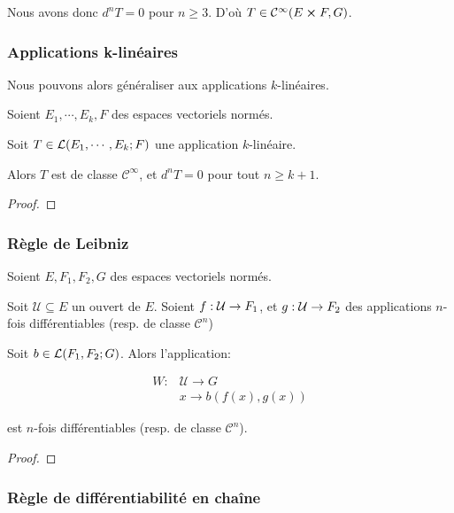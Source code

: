 Nous avons donc $d^{n}T = 0$ pour $n \geq 3$. D'où $T \in
\mathcal{C}^{\infty}(E \cross F, G)$.

\subsubsection{Applications k-linéaires}

Nous pouvons alors généraliser aux applications $k$-linéaires.

\begin{proposition}
	Soient $E_{1}, \cdots, E_{k}, F$ des espaces vectoriels normés.

	Soit $T \in \mathcal{L}(E_{1}, \cdots, E_{k}; F)$ une application
	$k$-linéaire.

	Alors $T$ est de classe $\mathcal{C}^{\infty}$, et $d^{n}T = 0$ pour tout $n
	\geq k + 1$.
\end{proposition}

\begin{proof}

\end{proof}

\subsubsection{Règle de Leibniz}

\begin{proposition}
	Soient $E, F_{1}, F_{2}, G$ des espaces vectoriels normés.

	Soit $\mathcal{U} \subseteq E$ un ouvert de $E$.
	Soient $f : \mathcal{U} \rightarrow F_{1}$, et
	$g : \mathcal{U} \rightarrow F_{2}$ des applications $n$-fois différentiables
	(resp. de classe $\mathcal{C}^{n}$)

	Soit $b \in \mathcal{L}(F_{1}, F_{2}; G)$.
	Alors l'application:

	\begin{align*}
		W : & \mathcal{U} \rightarrow G \\
			& x \rightarrow b(f(x), g(x))
	\end{align*}

	est $n$-fois différentiables (resp. de classe $\mathcal{C}^{n}$).
\end{proposition}

\ifdefined\outputproof
\begin{proof}

\end{proof}
\fi

\subsubsection{Règle de différentiabilité en chaîne}

